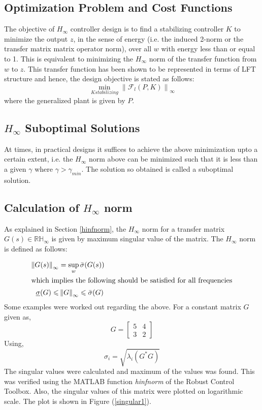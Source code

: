 \documentclass[a4paper,12pt]{article}
\newcommand\norm[1]{\left\lVert#1\right\rVert}
\begin{document}
			\subsection{Optimization Problem and Cost Functions} The objective of $H_{\infty}$ controller design is to find a stabilizing controller $K$ to minimize the output $z$, in the sense of energy (i.e. the induced 2-norm or the transfer matrix matrix operator norm), over all $w$ with energy less than or equal to 1. This is equivalent to minimizing the $H_{\infty}$ norm of the transfer function from $w$ to $z$. This transfer function has been shown to be represented in terms of LFT structure and hence, the design objective is stated as follows:
			\begin{equation}
				\min_{K stabilizing} \norm{\mathscr{F}_{l}(P,K)}_{\infty}
			\end{equation}
			where the generalized plant is given by $P$. 
			\subsection{$H_{\infty}$ Suboptimal Solutions} At times, in practical designs it suffices to achieve the above minimization upto a certain extent, i.e. the $H_{\infty}$ norm above can be minimized such that it is less than a given $\gamma$ where $\gamma > \gamma_{min}$. The solution so obtained is called a suboptimal solution. 
			\subsection{Calculation of $H_{\infty}$ norm} As explained in Section \ref{hinfnorm}, the $H_{\infty}$ norm for a transfer matrix $G(s) \in \mathbb{RH}_{\infty}$ is given by maximum singular value of the matrix. The $H_{\infty}$ norm is defined as follows:
			
			\begin{align}
				\norm{G(s)}_{\infty} &= \sup_{w}\bar{\sigma}(G(s))\\
				\intertext{which implies the following should be satisfied for all frequencies}
				 \underline{\sigma}(G) \leqslant &\norm{G}_{\infty} \leqslant \bar{\sigma}(G)
			\end{align}
		Some examples were worked out regarding the above. For a constant matrix $G$ given as, 
		\[G=
		\begin{bmatrix}
		5 &4\\3 & 2
		\end{bmatrix}
		\]
		Using, \begin{equation}
		\sigma_{i}=\sqrt{\lambda_{i}(G^{*}G)}
		\end{equation}
		The singular values were calculated and maximum of the values was found. This was verified using the MATLAB function \emph{hinfnorm} of the Robust Control Toolbox. Also, the singular values of this matrix were plotted on logarithmic scale. The plot is shown in Figure (\ref{singular1}).
		
\end{document}
